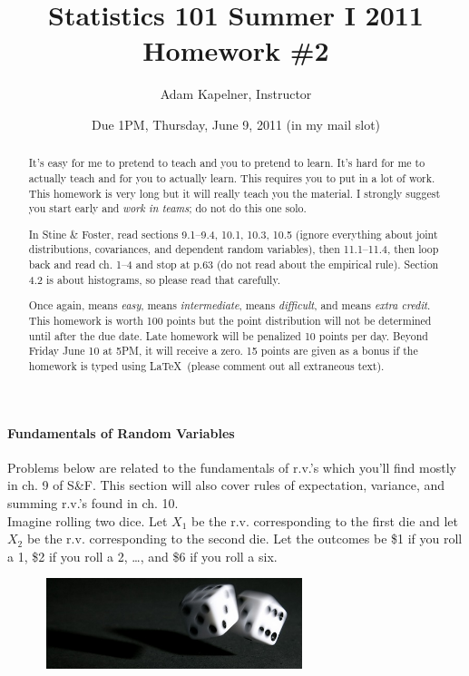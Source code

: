 \documentclass[12pt]{article}
\title{Statistics 101 Summer I 2011 \\ Homework \#2}
\author{Adam Kapelner, Instructor}
\date{Due 1PM, Thursday, June 9, 2011 (in my mail slot)}
\begin{document}
\maketitle


\begin{abstract}
It's easy for me to pretend to teach and you to pretend to learn. It's hard for me to actually teach and for you to actually learn. This requires you to put in a lot of work. This homework is very long but it will really teach you the material. I strongly suggest you start early and \textit{work in teams}; do not do this one solo.

In Stine \& Foster, read sections 9.1--9.4, 10.1, 10.3, 10.5 (ignore everything about joint distributions, covariances, and dependent random variables), then 11.1--11.4, then loop back and read ch. 1--4 and stop at p.63 (do not read about the empirical rule). Section 4.2 is about histograms, so please read that carefully.

Once again,  means \textit{easy},  means \textit{intermediate},  means \textit{difficult}, and  means \textit{extra credit}. This homework is worth 100 points but the point distribution will not be determined until after the due date. Late homework will be penalized 10 points per day. Beyond Friday June 10 at 5PM, it will receive a zero. 15 points are given as a bonus if the homework is typed using \LaTeX ~(please comment out all extraneous text).
\end{abstract}

\paragraph{Fundamentals of Random Variables} Problems below are related to the fundamentals of r.v.'s which you'll find mostly in ch. 9 of S\&F. This section will also cover rules of expectation, variance, and summing r.v.'s found in ch. 10. \\

\problem Imagine rolling two dice. Let $X_1$ be the r.v. corresponding to the first die and let $X_2$ be the r.v. corresponding to the second die. Let the outcomes be \$1 if you roll a 1, \$2 if you roll a 2, \ldots, and \$6 if you roll a six.

\begin{figure}[htp]
\centering
\includegraphics[width=3in, height=1.035in]{dice.jpg}
\end{figure}
\FloatBarrier
\end{document}
